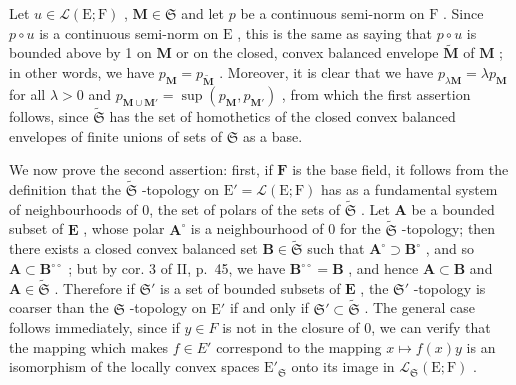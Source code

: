 Let \(u \in \mathcal{L}(\mathrm{E};\mathrm{F})\) , \(\mathbf{M} \in \mathfrak{S}\) and let \(p\) be a continuous semi-norm on \(\mathrm{F}\) . Since \(p \circ u\) is a continuous semi-norm on \(\mathrm{E}\) , this is the same as saying that \(p \circ u\) is bounded above by 1 on \(\mathbf{M}\) or on the closed, convex balanced envelope \(\tilde{\mathbf{M}}\) of \(\mathbf{M}\) ; in other words, we have \(p_{\mathbf{M}} = p_{\tilde{\mathbf{M}}}\) . Moreover, it is clear that we have \(p_{\lambda \mathbf{M}} = \lambda p_{\mathbf{M}}\) for all \(\lambda > 0\) and \(p_{\mathbf{M} \cup \mathbf{M}'} = \sup(p_{\mathbf{M}}, p_{\mathbf{M}'})\) , from which the first assertion follows, since \(\tilde{\mathfrak{S}}\) has the set of homothetics of the closed convex balanced envelopes of finite unions of sets of \(\mathfrak{S}\) as a base.

We now prove the second assertion: first, if \(\mathbf{F}\) is the base field, it follows from the definition that the \(\tilde{\mathfrak{S}}\) -topology on \(\mathrm{E}' = \mathcal{L}(\mathrm{E};\mathrm{F})\) has as a fundamental system of neighbourhoods of 0, the set of polars of the sets of \(\tilde{\mathfrak{S}}\) . Let \(\mathbf{A}\) be a bounded subset of \(\mathbf{E}\) , whose polar \(\mathbf{A}^{\circ}\) is a neighbourhood of 0 for the \(\tilde{\mathfrak{S}}\) -topology; then there exists a closed convex balanced set \(\mathbf{B} \in \tilde{\mathfrak{S}}\) such that \(\mathbf{A}^{\circ} \supset \mathbf{B}^{\circ}\) , and so \(\mathbf{A} \subset \mathbf{B}^{\circ \circ}\) ; but by cor. 3 of II, p.~45, we have \(\mathbf{B}^{\circ \circ} = \mathbf{B}\) , and hence \(\mathbf{A} \subset \mathbf{B}\) and \(\mathbf{A} \in \tilde{\mathfrak{S}}\) . Therefore if \(\mathfrak{S}'\) is a set of bounded subsets of \(\mathbf{E}\) , the \(\mathfrak{S}'\) -topology is coarser than the \(\mathfrak{S}\) -topology on \(\mathrm{E}'\) if and only if \(\mathfrak{S}' \subset \tilde{\mathfrak{S}}\) . The general case follows immediately, since if \(y \in F\) is not in the closure of 0, we can verify that the mapping which makes \(f \in E'\) correspond to the mapping \(x \mapsto f(x)y\) is an isomorphism of the locally convex spaces \(\mathrm{E}'_{\mathfrak{S}}\) onto its image in \(\mathcal{L}_{\mathfrak{S}}(\mathrm{E};\mathrm{F})\) .

